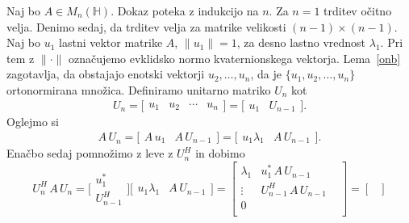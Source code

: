 \documentclass[mat1, tisk]{fmfdelo}
\numberwithin{equation}{section}
\begin{document}
\begin{dokaz}
    Naj bo $A \in M_{n}(\mathbb{H})$. Dokaz poteka z indukcijo na $n$. Za $n = 1$ trditev očitno velja.
    Denimo sedaj, da trditev velja za matrike velikosti $(n-1)\times(n-1)$. Naj bo $u_1$ lastni vektor matrike $A$, 
    $\lVert u_1 \rVert = 1$, za desno lastno vrednost $\lambda_1$. Pri tem z $\lVert \cdot \rVert$ označujemo evklidsko 
    normo kvaternionskega vektorja. Lema~\ref{onb} zagotavlja, da obstajajo enotski vektorji $u_2, 
    \ldots, u_n$, da je $\{u_1, u_2,\ldots, u_n\}$ ortonormirana množica. Definiramo unitarno matriko $U_n$ kot
    \begin{equation*}
        U_n =
        \Bigg[\begin{matrix}
            u_1 & u_2 & \cdots & u_n
        \end{matrix}\Bigg]
        =
        \Bigg[\begin{matrix}
            u_1 & U_{n-1}
        \end{matrix}\Bigg].
    \end{equation*}
    Oglejmo si
    \begin{equation*}
        A \, U_n =
        \Bigg[\begin{matrix}
            A \, u_1 & A \, U_{n-1} 
        \end{matrix}\Bigg]
        =
        \Bigg[\begin{matrix}
            u_1\lambda_1 & A \, U_{n-1}
        \end{matrix}\Bigg].
    \end{equation*}
    Enačbo sedaj pomnožimo z leve z $U_n^H$ in dobimo
    \begin{equation*}
        U_n^H \, A \, U_n = 
        \Bigg[\begin{matrix}
           u_1^* \\
           U_{n-1}^H 
        \end{matrix}\Bigg]
        \Bigg[\begin{matrix}
            u_1\lambda_1 & A \, U_{n-1}
        \end{matrix}\Bigg]
        =
        \begin{bmatrix} 
            \lambda_1 & {u^*_1} \, A \,U_{n-1} \\
            \vdots & U_{n-1}^H \, A \, U_{n-1}   \\
            0      &                 &   \\ 
        \end{bmatrix}
        =
        \begin{bmatrix}

\end{bmatrix}
\end{equation*}
\end{dokaz}
\end{document}

